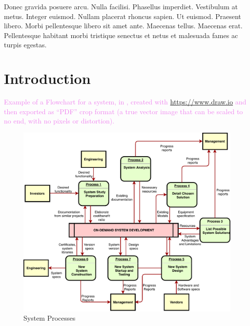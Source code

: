 \cleardoublepage
\label{chap:architecture}

Donec gravida posuere arcu. Nulla facilisi. Phasellus imperdiet. Vestibulum at metus. Integer euismod. Nullam placerat rhoncus sapien. Ut euismod. Praesent libero. Morbi pellentesque libero sit amet ante. Maecenas tellus. Maecenas erat. Pellentesque habitant morbi tristique senectus et netus et malesuada fames ac turpis egestas.
\section{Introduction} 
\textcolor{violet}{Example of a Flowchart for a system, in , created with \url{https://www.draw.io} and then exported as ``PDF'' crop format (a true vector image that can be scaled to no end, with no pixels or distortion).}

\begin{figure}[h]
\centering
\includegraphics[width=1.0\textwidth]{./Images/Flowchart_from_draw-io.pdf}
\caption{System Processes}
\label{fig:flowchart}
\end{figure}

